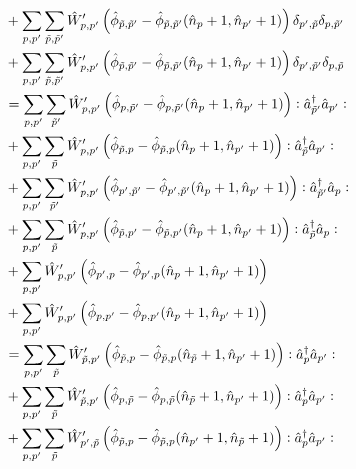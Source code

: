 \begin{appendix}
\begin{itemize}
\begin{align}
&+\Sum_{p, p^\prime}\Sum_{\tilde p,\tilde p^\prime}\hat W_{p,p^\prime}^\prime \left(\hat\phi_{\tilde p,\tilde p^\prime}-\hat\phi_{\tilde p,\tilde p^\prime}(\hat n_p+1,\hat n_{p^\prime}+1)\right)\delta_{p^\prime,\tilde p}\delta_{p,\tilde p^\prime} \nonumber\\
&+\Sum_{p, p^\prime}\Sum_{\tilde p,\tilde p^\prime}\hat W_{p,p^\prime}^\prime \left(\hat\phi_{\tilde p,\tilde p^\prime}-\hat\phi_{\tilde p,\tilde p^\prime}(\hat n_p+1,\hat n_{p^\prime}+1)\right)\delta_{p^\prime,\tilde p^\prime}\delta_{p,\tilde p} \nonumber\\
&= \Sum_{p, p^\prime}\Sum_{\tilde p^\prime}\hat W_{p,p^\prime}^\prime \left(\hat\phi_{ p,\tilde p^\prime}-\hat\phi_{ p,\tilde p^\prime}(\hat n_p+1,\hat n_{p^\prime}+1)\right)\NO\CR_{\tilde p^\prime}\AN_{p^\prime}\NO \\
&+\Sum_{p, p^\prime}\Sum_{\tilde p}\hat W_{p,p^\prime}^\prime \left(\hat\phi_{\tilde p,p}-\hat\phi_{\tilde p,p}(\hat n_p+1,\hat n_{p^\prime}+1)\right)\NO\CR_{\tilde p}\AN_{p^\prime}\NO \nonumber\\
&+\Sum_{p, p^\prime}\Sum_{\tilde p^\prime}\hat W_{p,p^\prime}^\prime \left(\hat\phi_{p^\prime,\tilde p^\prime}-\hat\phi_{p^\prime,\tilde p^\prime}(\hat n_p+1,\hat n_{p^\prime}+1)\right)\NO\CR_{\tilde p^\prime}\AN_{p}\NO \nonumber\\
&+\Sum_{p, p^\prime}\Sum_{\tilde p}\hat W_{p,p^\prime}^\prime \left(\hat\phi_{\tilde p, p^\prime}-\hat\phi_{\tilde p, p^\prime}(\hat n_p+1,\hat n_{p^\prime}+1)\right)\NO\CR_{\tilde p}\AN_{p}\NO \nonumber\\
&+\Sum_{p, p^\prime}\hat W_{p,p^\prime}^\prime \left(\hat\phi_{p^\prime,p}-\hat\phi_{p^\prime,p}(\hat n_p+1,\hat n_{p^\prime}+1)\right) \nonumber\\
&+\Sum_{p, p^\prime}\hat W_{p,p^\prime}^\prime \left(\hat\phi_{ p, p^\prime}-\hat\phi_{ p, p^\prime}(\hat n_p+1,\hat n_{p^\prime}+1)\right)\nonumber\\
&= \Sum_{p, p^\prime}\Sum_{\tilde p}\hat W_{\tilde p,p^\prime}^\prime \left(\hat\phi_{ \tilde p,p}-\hat\phi_{ \tilde p,p}(\hat n_{\tilde p}+1,\hat n_{p^\prime}+1)\right)\NO\CR_{p}\AN_{p^\prime}\NO \\
&+\Sum_{p, p^\prime}\Sum_{\tilde p}\hat W_{\tilde p,p^\prime}^\prime \left(\hat\phi_{p,\tilde p}-\hat\phi_{p,\tilde p}(\hat n_{\tilde p}+1,\hat n_{p^\prime}+1)\right)\NO\CR_{p}\AN_{p^\prime}\NO \nonumber\\
&+\Sum_{p, p^\prime}\Sum_{\tilde p}\hat W_{p^\prime,\tilde p}^\prime \left(\hat\phi_{\tilde p,p}-\hat\phi_{\tilde p,p}(\hat n_{p^\prime}+1,\hat n_{\tilde p}+1)\right)\NO\CR_{p}\AN_{p^\prime}\NO \nonumber\\

\end{align}
\end{itemize}
\end{appendix}
